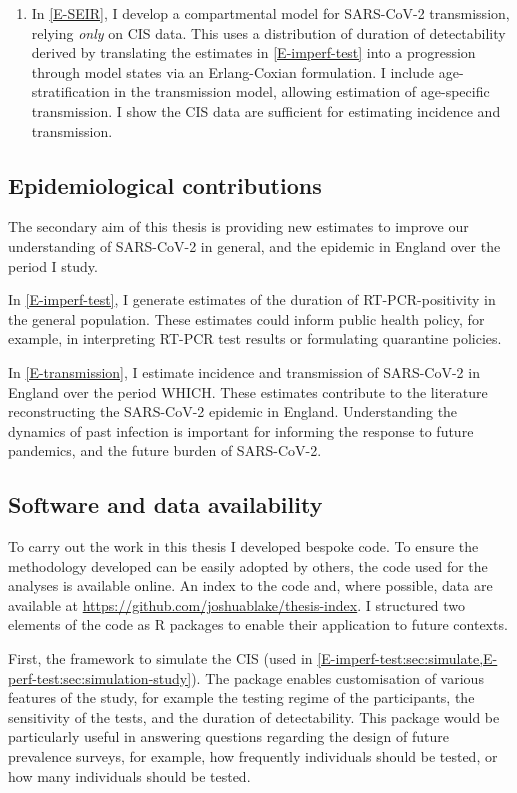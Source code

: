 \documentclass[thesis.tex]{subfiles}
\begin{document}
\begin{enumerate}
    \item In \cref{E-SEIR}, I develop a compartmental model for SARS-CoV-2 transmission, relying \emph{only} on CIS data. 
    This uses a distribution of duration of detectability derived by translating the estimates in \cref{E-imperf-test} into a progression through model states via an Erlang-Coxian formulation. I include age-stratification in the transmission model, allowing estimation of age-specific transmission.
    I show the CIS data are sufficient for estimating incidence and transmission.
\end{enumerate}

\subsection{Epidemiological contributions}

The secondary aim of this thesis is providing new estimates to improve our understanding of SARS-CoV-2 in general, and the epidemic in England over the period I study.

In \cref{E-imperf-test}, I generate estimates of the duration of RT-PCR-positivity in the general population.
These estimates could inform public health policy, for example, in interpreting RT-PCR test results or formulating quarantine policies.

In \cref{E-transmission}, I estimate incidence and transmission of SARS-CoV-2 in England over the period WHICH.
These estimates contribute to the literature reconstructing the SARS-CoV-2 epidemic in England.
Understanding the dynamics of past infection is important for informing the response to future pandemics, and the future burden of SARS-CoV-2.

\subsection{Software and data availability}

To carry out the work in this thesis I developed bespoke code. To ensure the methodology developed can be easily adopted by others, the code used for the analyses is available online.
An index to the code and, where possible, data are available at \url{https://github.com/joshuablake/thesis-index}.
I structured two elements of the code as R packages to enable their application to future contexts.

First, the framework to simulate the CIS (used in \cref{E-imperf-test:sec:simulate,E-perf-test:sec:simulation-study}).
The package enables customisation of various features of the study, for example the testing regime of the participants, the sensitivity of the tests, and the duration of detectability.
This package would be particularly useful in answering questions regarding the design of future prevalence surveys, for example, how frequently individuals should be tested, or how many individuals should be tested.
\end{document}

